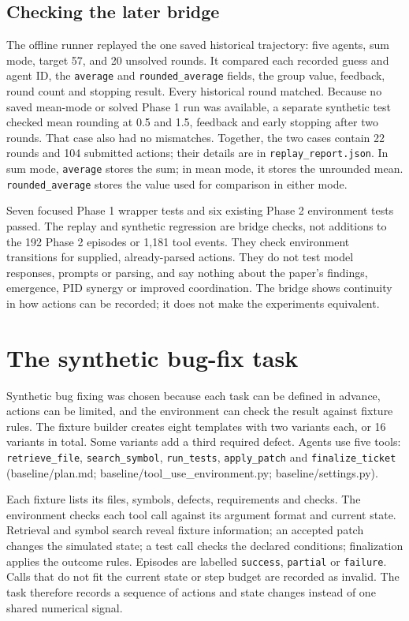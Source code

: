 \documentclass[12pt,a4paper,oneside]{report}
\begin{document}
\subsection{Checking the later bridge}
The offline runner replayed the one saved historical trajectory: five agents, sum mode, target 57, and 20 unsolved rounds. It compared each recorded guess and agent ID, the \texttt{average} and \texttt{rounded\allowbreak\_average} fields, the group value, feedback, round count and stopping result. Every historical round matched. Because no saved mean-mode or solved Phase 1 run was available, a separate synthetic test checked mean rounding at 0.5 and 1.5, feedback and early stopping after two rounds. That case also had no mismatches. Together, the two cases contain 22 rounds and 104 submitted actions; their details are in \texttt{replay\allowbreak\_report.json}. In sum mode, \texttt{average} stores the sum; in mean mode, it stores the unrounded mean. \texttt{rounded\allowbreak\_average} stores the value used for comparison in either mode.

Seven focused Phase 1 wrapper tests and six existing Phase 2 environment tests passed. The replay and synthetic regression are bridge checks, not additions to the 192 Phase 2 episodes or 1,181 tool events. They check environment transitions for supplied, already-parsed actions. They do not test model responses, prompts or parsing, and say nothing about the paper’s findings, emergence, PID synergy or improved coordination. The bridge shows continuity in how actions can be recorded; it does not make the experiments equivalent.

\section{The synthetic bug-fix task}
Synthetic bug fixing was chosen because each task can be defined in advance, actions can be limited, and the environment can check the result against fixture rules. The fixture builder creates eight templates with two variants each, or 16 variants in total. Some variants add a third required defect. Agents use five tools: \texttt{retrieve\allowbreak\_file}, \texttt{search\allowbreak\_symbol}, \texttt{run\allowbreak\_tests}, \texttt{apply\allowbreak\_patch} and \texttt{finalize\allowbreak\_ticket} (baseline/plan.md; baseline/tool\allowbreak\_use\allowbreak\_environment.py; baseline/settings.py).

Each fixture lists its files, symbols, defects, requirements and checks. The environment checks each tool call against its argument format and current state. Retrieval and symbol search reveal fixture information; an accepted patch changes the simulated state; a test call checks the declared conditions; finalization applies the outcome rules. Episodes are labelled \texttt{success}, \texttt{partial} or \texttt{failure}. Calls that do not fit the current state or step budget are recorded as invalid. The task therefore records a sequence of actions and state changes instead of one shared numerical signal.
\end{document}
